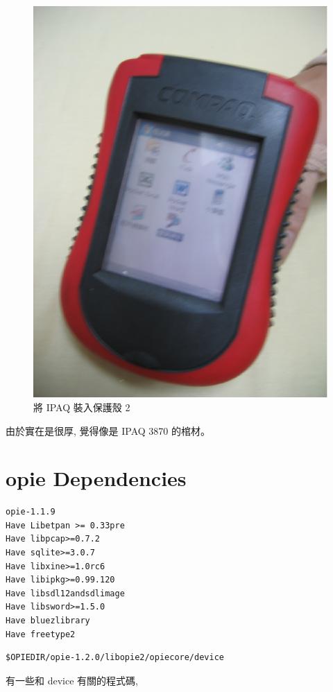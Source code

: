 \documentclass[12pt,a4paper]{article}
\begin{document}
\begin{CJK}{UTF8}{cwmu}
\begin{figure}[htbp]
\includegraphics[scale=0.35]{eps/shell_7.eps}
\caption{將 IPAQ 裝入保護殼 2}
\end{figure}

由於實在是很厚, 覺得像是 IPAQ 3870 的棺材。

\section{opie Dependencies}
\begin{verbatim}
opie-1.1.9
Have Libetpan >= 0.33pre
Have libpcap>=0.7.2
Have sqlite>=3.0.7
Have libxine>=1.0rc6
Have libipkg>=0.99.120
Have libsdl12andsdlimage
Have libsword>=1.5.0
Have bluezlibrary
Have freetype2
\end{verbatim}


\begin{verbatim}
$OPIEDIR/opie-1.2.0/libopie2/opiecore/device
\end{verbatim}
有一些和 device 有關的程式碼,


\end{CJK}
\end{document}

